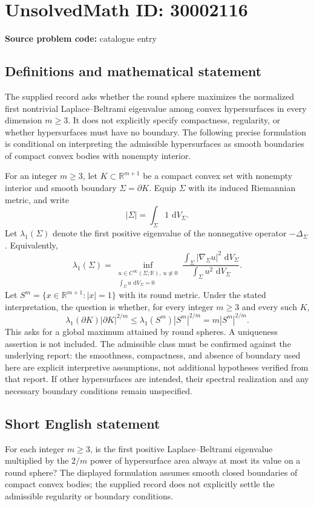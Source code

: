 \documentclass[11pt]{article}
\newcommand{\R}{\mathbb{R}}
\newcommand{\dd}{\,\mathrm{d}}
\begin{document}
\section*{UnsolvedMath ID: 30002116}
\textbf{Source problem code:} catalogue entry
\subsection{Definitions and mathematical statement}
The supplied record asks whether the round sphere maximizes the normalized first nontrivial Laplace--Beltrami eigenvalue among convex hypersurfaces in every dimension \(m\geq 3\). It does not explicitly specify compactness, regularity, or whether hypersurfaces must have no boundary. The following precise formulation is conditional on interpreting the admissible hypersurfaces as smooth boundaries of compact convex bodies with nonempty interior.

For an integer \(m\geq 3\), let \(K\subset\R^{m+1}\) be a compact convex set with nonempty interior and smooth boundary \(\Sigma=\partial K\). Equip \(\Sigma\) with its induced Riemannian metric, and write
\[
|\Sigma|=\int_\Sigma 1\,\dd V_\Sigma.
\]
Let \(\lambda_1(\Sigma)\) denote the first positive eigenvalue of the nonnegative operator \(-\Delta_\Sigma\). Equivalently,
\[
\lambda_1(\Sigma)=\inf_{\substack{u\in C^\infty(\Sigma;\R),\ u\not\equiv0\\ \int_\Sigma u\,\dd V_\Sigma=0}}
\frac{\int_\Sigma |\nabla_\Sigma u|^2\,\dd V_\Sigma}{\int_\Sigma u^2\,\dd V_\Sigma}.
\]
Let \(S^m=\{x\in\R^{m+1}:|x|=1\}\) with its round metric. Under the stated interpretation, the question is whether, for every integer \(m\geq3\) and every such \(K\),
\[
\lambda_1(\partial K)|\partial K|^{2/m}
\leq \lambda_1(S^m)|S^m|^{2/m}
= m|S^m|^{2/m}.
\]
This asks for a global maximum attained by round spheres. A uniqueness assertion is not included. The admissible class must be confirmed against the underlying report: the smoothness, compactness, and absence of boundary used here are explicit interpretive assumptions, not additional hypotheses verified from that report. If other hypersurfaces are intended, their spectral realization and any necessary boundary conditions remain unspecified.
\subsection{Short English statement}
For each integer \(m\geq3\), is the first positive Laplace--Beltrami eigenvalue multiplied by the \(2/m\) power of hypersurface area always at most its value on a round sphere? The displayed formulation assumes smooth closed boundaries of compact convex bodies; the supplied record does not explicitly settle the admissible regularity or boundary conditions.
\end{document}
